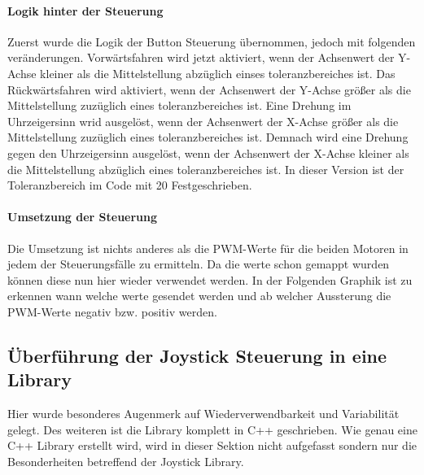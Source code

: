 \documentclass[12pt]{article}
\begin{document}
\paragraph{Logik hinter der Steuerung}
Zuerst wurde die Logik der Button Steuerung übernommen, jedoch mit folgenden veränderungen. 
Vorwärtsfahren wird jetzt aktiviert, wenn der Achsenwert der Y-Achse kleiner als die Mittelstellung abzüglich einses toleranzbereiches ist.
Das Rückwärtsfahren wird aktiviert, wenn der Achsenwert der Y-Achse größer als die Mittelstellung zuzüglich eines toleranzbereiches ist.
Eine Drehung im Uhrzeigersinn wrid ausgelöst, wenn der Achsenwert der X-Achse größer als die Mittelstellung zuzüglich eines toleranzbereiches ist. Demnach wird eine Drehung gegen den Uhrzeigersinn ausgelöst, wenn der Achsenwert der X-Achse kleiner als die Mittelstellung abzüglich eines toleranzbereiches ist.
In dieser Version ist der Toleranzbereich im Code mit 20 Festgeschrieben.
\paragraph{Umsetzung der Steuerung}
Die Umsetzung ist nichts anderes als die PWM-Werte für die beiden Motoren in jedem der Steuerungsfälle zu ermitteln. Da die werte schon gemappt wurden können diese nun hier wieder verwendet werden. In der Folgenden Graphik ist zu erkennen wann welche werte gesendet werden und ab welcher Aussterung die PWM-Werte negativ bzw. positiv werden.

\subsection{Überführung der Joystick Steuerung in eine Library} %
Hier wurde besonderes Augenmerk auf Wiederverwendbarkeit und Variabilität gelegt.
Des weiteren ist die Library komplett in C++ geschrieben. Wie genau eine C++ Library erstellt wird, wird in dieser Sektion nicht aufgefasst sondern nur die Besonderheiten betreffend der Joystick Library.
\end{document}
